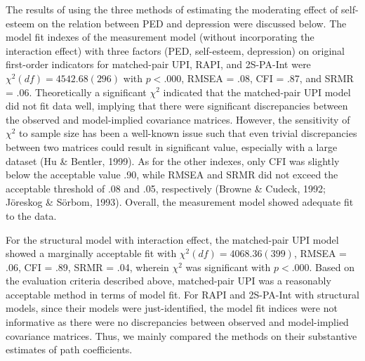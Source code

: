 \documentclass[
  man]{apa7}
\begin{document}
The results of using the three methods of estimating the moderating effect of self-esteem on the relation between PED and depression were discussed below. The model fit indexes of the measurement model (without incorporating the interaction effect) with three factors (PED, self-esteem, depression) on original first-order indicators for matched-pair UPI, RAPI, and 2S-PA-Int were \(\chi^2(df) = 4542.68(296)\) with \(\textit{p} < .000\), RMSEA = .08, CFI = .87, and SRMR = .06. Theoretically a significant \(\chi^2\) indicated that the matched-pair UPI model did not fit data well, implying that there were significant discrepancies between the observed and model-implied covariance matrices. However, the sensitivity of \(\chi^2\) to sample size has been a well-known issue such that even trivial discrepancies between two matrices could result in significant value, especially with a large dataset (Hu \& Bentler, 1999). As for the other indexes, only CFI was slightly below the acceptable value .90, while RMSEA and SRMR did not exceed the acceptable threshold of .08 and .05, respectively (Browne \& Cudeck, 1992; Jöreskog \& Sörbom, 1993). Overall, the measurement model showed adequate fit to the data.

For the structural model with interaction effect, the matched-pair UPI model showed a marginally acceptable fit with \(\chi^2(df) = 4068.36(399)\), RMSEA = .06, CFI = .89, SRMR = .04, wherein \(\chi^2\) was significant with \(\textit{p} < .000\). Based on the evaluation criteria described above, matched-pair UPI was a reasonably acceptable method in terms of model fit. For RAPI and 2S-PA-Int with structural models, since their models were just-identified, the model fit indices were not informative as there were no discrepancies between observed and model-implied covariance matrices. Thus, we mainly compared the methods on their substantive estimates of path coefficients.
\end{document}
